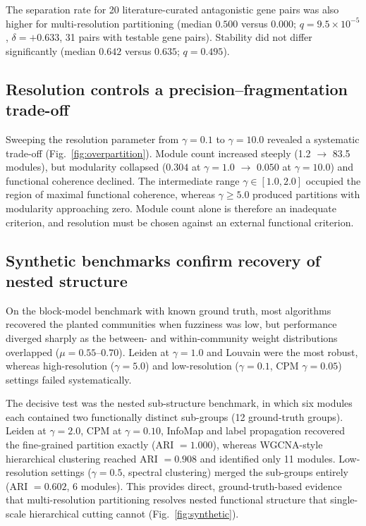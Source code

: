 \documentclass[twocolumn,11pt]{article}
\begin{document}
The separation rate for 20 literature-curated antagonistic gene pairs was also higher for
multi-resolution partitioning (median $0.500$ versus $0.000$; $q = 9.5\times10^{-5}$,
$\delta = +0.633$, 31 pairs with testable gene pairs). Stability did not differ
significantly (median $0.642$ versus $0.635$; $q = 0.495$).

\subsection{Resolution controls a precision--fragmentation trade-off}

Sweeping the resolution parameter from $\gamma = 0.1$ to $\gamma = 10.0$ revealed a
systematic trade-off (Fig.~\ref{fig:overpartition}). Module count increased steeply
(1.2 $\rightarrow$ 83.5 modules), but modularity collapsed ($0.304$ at $\gamma=1.0$
$\rightarrow$ $0.050$ at $\gamma=10.0$) and functional coherence declined. The intermediate
range $\gamma\in[1.0,2.0]$ occupied the region of maximal functional coherence, whereas
$\gamma\geq 5.0$ produced partitions with modularity approaching zero. Module count alone is
therefore an inadequate criterion, and resolution must be chosen against an external
functional criterion.

\subsection{Synthetic benchmarks confirm recovery of nested structure}

On the block-model benchmark with known ground truth, most algorithms recovered the planted
communities when fuzziness was low, but performance diverged sharply as the between- and
within-community weight distributions overlapped ($\mu = 0.55$--$0.70$). Leiden at
$\gamma=1.0$ and Louvain were the most robust, whereas high-resolution
($\gamma = 5.0$) and low-resolution ($\gamma = 0.1$, CPM $\gamma = 0.05$) settings failed
systematically.

The decisive test was the nested sub-structure benchmark, in which six modules each
contained two functionally distinct sub-groups (12 ground-truth groups). Leiden at
$\gamma = 2.0$, CPM at $\gamma = 0.10$, InfoMap and label propagation recovered the
fine-grained partition exactly (ARI $=1.000$), whereas WGCNA-style hierarchical clustering
reached ARI $= 0.908$ and identified only 11 modules. Low-resolution settings
($\gamma=0.5$, spectral clustering) merged the sub-groups entirely (ARI $= 0.602$,
6 modules). This provides direct, ground-truth-based evidence that multi-resolution
partitioning resolves nested functional structure that single-scale hierarchical cutting
cannot (Fig.~\ref{fig:synthetic}).
\end{document}
